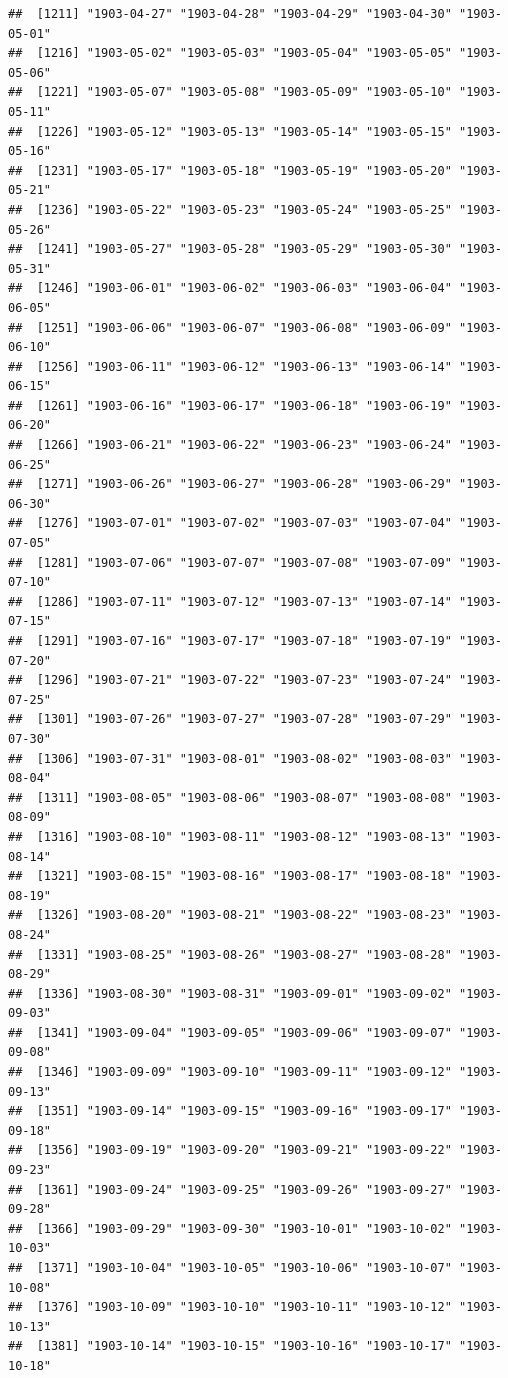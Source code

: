 \documentclass{article}\usepackage[]{graphicx}\usepackage[]{color}
\makeatletter
\newenvironment{kframe}{%
 \def\at@end@of@kframe{}%
 \ifinner\ifhmode%
  \def\at@end@of@kframe{\end{minipage}}%
  \begin{minipage}{\columnwidth}%
 \fi\fi%
 \def\FrameCommand##1{\hskip\@totalleftmargin \hskip-\fboxsep
 \colorbox{shadecolor}{##1}\hskip-\fboxsep
     \hskip-\linewidth \hskip-\@totalleftmargin \hskip\columnwidth}%
 \MakeFramed {\advance\hsize-\width
   \@totalleftmargin\z@ \linewidth\hsize
   \@setminipage}}%
 {\par\unskip\endMakeFramed%
 \at@end@of@kframe}
\newenvironment{knitrout}{}{} %
\makeatother
\begin{document}
\begin{description}
\begin{knitrout}
\begin{kframe}
\begin{verbatim}
##  [1211] "1903-04-27" "1903-04-28" "1903-04-29" "1903-04-30" "1903-05-01"
##  [1216] "1903-05-02" "1903-05-03" "1903-05-04" "1903-05-05" "1903-05-06"
##  [1221] "1903-05-07" "1903-05-08" "1903-05-09" "1903-05-10" "1903-05-11"
##  [1226] "1903-05-12" "1903-05-13" "1903-05-14" "1903-05-15" "1903-05-16"
##  [1231] "1903-05-17" "1903-05-18" "1903-05-19" "1903-05-20" "1903-05-21"
##  [1236] "1903-05-22" "1903-05-23" "1903-05-24" "1903-05-25" "1903-05-26"
##  [1241] "1903-05-27" "1903-05-28" "1903-05-29" "1903-05-30" "1903-05-31"
##  [1246] "1903-06-01" "1903-06-02" "1903-06-03" "1903-06-04" "1903-06-05"
##  [1251] "1903-06-06" "1903-06-07" "1903-06-08" "1903-06-09" "1903-06-10"
##  [1256] "1903-06-11" "1903-06-12" "1903-06-13" "1903-06-14" "1903-06-15"
##  [1261] "1903-06-16" "1903-06-17" "1903-06-18" "1903-06-19" "1903-06-20"
##  [1266] "1903-06-21" "1903-06-22" "1903-06-23" "1903-06-24" "1903-06-25"
##  [1271] "1903-06-26" "1903-06-27" "1903-06-28" "1903-06-29" "1903-06-30"
##  [1276] "1903-07-01" "1903-07-02" "1903-07-03" "1903-07-04" "1903-07-05"
##  [1281] "1903-07-06" "1903-07-07" "1903-07-08" "1903-07-09" "1903-07-10"
##  [1286] "1903-07-11" "1903-07-12" "1903-07-13" "1903-07-14" "1903-07-15"
##  [1291] "1903-07-16" "1903-07-17" "1903-07-18" "1903-07-19" "1903-07-20"
##  [1296] "1903-07-21" "1903-07-22" "1903-07-23" "1903-07-24" "1903-07-25"
##  [1301] "1903-07-26" "1903-07-27" "1903-07-28" "1903-07-29" "1903-07-30"
##  [1306] "1903-07-31" "1903-08-01" "1903-08-02" "1903-08-03" "1903-08-04"
##  [1311] "1903-08-05" "1903-08-06" "1903-08-07" "1903-08-08" "1903-08-09"
##  [1316] "1903-08-10" "1903-08-11" "1903-08-12" "1903-08-13" "1903-08-14"
##  [1321] "1903-08-15" "1903-08-16" "1903-08-17" "1903-08-18" "1903-08-19"
##  [1326] "1903-08-20" "1903-08-21" "1903-08-22" "1903-08-23" "1903-08-24"
##  [1331] "1903-08-25" "1903-08-26" "1903-08-27" "1903-08-28" "1903-08-29"
##  [1336] "1903-08-30" "1903-08-31" "1903-09-01" "1903-09-02" "1903-09-03"
##  [1341] "1903-09-04" "1903-09-05" "1903-09-06" "1903-09-07" "1903-09-08"
##  [1346] "1903-09-09" "1903-09-10" "1903-09-11" "1903-09-12" "1903-09-13"
##  [1351] "1903-09-14" "1903-09-15" "1903-09-16" "1903-09-17" "1903-09-18"
##  [1356] "1903-09-19" "1903-09-20" "1903-09-21" "1903-09-22" "1903-09-23"
##  [1361] "1903-09-24" "1903-09-25" "1903-09-26" "1903-09-27" "1903-09-28"
##  [1366] "1903-09-29" "1903-09-30" "1903-10-01" "1903-10-02" "1903-10-03"
##  [1371] "1903-10-04" "1903-10-05" "1903-10-06" "1903-10-07" "1903-10-08"
##  [1376] "1903-10-09" "1903-10-10" "1903-10-11" "1903-10-12" "1903-10-13"
##  [1381] "1903-10-14" "1903-10-15" "1903-10-16" "1903-10-17" "1903-10-18"

\end{verbatim}
\end{kframe}
\end{knitrout}
\end{description}
\end{document}
